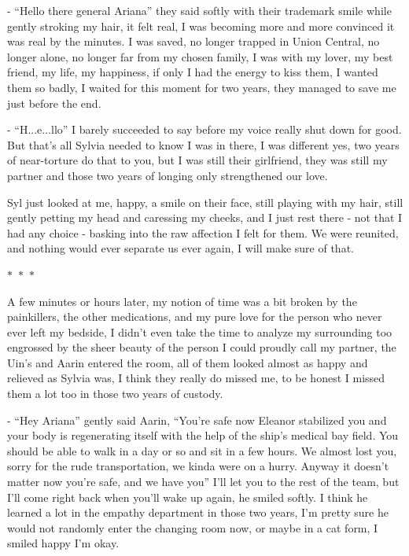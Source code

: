 \documentclass[colorlinks,12pt,a4paper]{book}
\newcommand\sep{\begin{center}
  \boldmath $\ast$~$\ast$~$\ast$
\end{center}}
\begin{document}
 - “Hello there general Ariana” they said softly with their trademark smile while gently stroking my hair, it felt real, 
 I was becoming more and more convinced it was real by the minutes. I was saved, no longer trapped in Union Central, 
 no longer alone, no longer far from my chosen family, I was with my lover, my best friend, my life, my happiness, 
 if only I had the energy to kiss them, I wanted them so badly, I waited for this moment for two years, they managed 
 to save me just before the end.\par
 \bigskip
 
 - “H...e...llo” I barely succeeded to say before my voice really shut down for good. But that's all Sylvia needed to 
 know I was in there, I was different yes, two years of near-torture do that to you, but I was still their girlfriend, 
 they was still my partner and those two years of longing only strengthened our love.\par
 \bigskip
 
 Syl just looked at me, happy, a smile on their face, still playing with my hair, still gently petting my head and
  caressing my cheeks, and I just rest there - not that I had any choice - basking into the raw affection I felt for them.
   We were reunited, and nothing would ever separate us ever again, I will make sure of that.
 
 \sep 
 
 A few minutes or hours later, my notion of time was a bit broken by the painkillers, the other medications, and 
 my pure love for the person who never ever left my bedside, I didn't even take the time to analyze my surrounding 
 too engrossed by the sheer beauty of the person I could proudly call my partner, the Uin's and Aarin entered the room, 
 all of them looked almost as happy and relieved as Sylvia was, I think they really do missed me, to be honest I missed
  them a lot too in those two years of custody.\par
  \bigskip
 
 - “Hey Ariana” gently said Aarin, “You're safe now Eleanor stabilized you and your body is regenerating itself with the 
 help of the ship's medical bay field. You should be able to walk in a day or so and sit in a few hours. We almost lost
  you, sorry for the rude transportation, we kinda were on a hurry. Anyway it doesn't matter now you're safe, and we have 
  you” I'll let you to the rest of the team, but I'll come right back when you'll wake up again, he smiled softly. 
  I think he learned a lot in the empathy department in those two years, I'm pretty sure he would not randomly
   enter the changing room now, or maybe in a cat form, I smiled happy I'm okay.\par
   \bigskip
 
\end{document}
